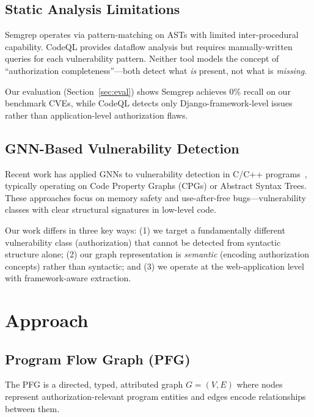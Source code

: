 \documentclass[conference]{IEEEtran}
\begin{document}
\subsection{Static Analysis Limitations}

Semgrep operates via pattern-matching on ASTs with limited inter-procedural capability. CodeQL provides dataflow analysis but requires manually-written queries for each vulnerability pattern. Neither tool models the concept of ``authorization completeness''—both detect what \emph{is} present, not what is \emph{missing}.

Our evaluation (Section~\ref{sec:eval}) shows Semgrep achieves 0\% recall on our benchmark CVEs, while CodeQL detects only Django-framework-level issues rather than application-level authorization flaws.

\subsection{GNN-Based Vulnerability Detection}

Recent work has applied GNNs to vulnerability detection in C/C++ programs~\cite{devign,reveal,ivdetect}, typically operating on Code Property Graphs (CPGs) or Abstract Syntax Trees. These approaches focus on memory safety and use-after-free bugs—vulnerability classes with clear structural signatures in low-level code.

Our work differs in three key ways: (1) we target a fundamentally different vulnerability class (authorization) that cannot be detected from syntactic structure alone; (2) our graph representation is \emph{semantic} (encoding authorization concepts) rather than syntactic; and (3) we operate at the web-application level with framework-aware extraction.

\section{Approach}

\subsection{Program Flow Graph (PFG)}

The PFG is a directed, typed, attributed graph $G = (V, E)$ where nodes represent authorization-relevant program entities and edges encode relationships between them.
\end{document}
